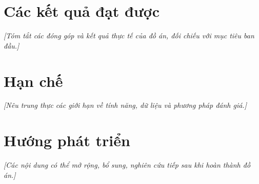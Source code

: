 \section*{Các kết quả đạt được}
\textit{[Tóm tắt các đóng góp và kết quả thực tế của đồ án, đối chiếu với mục tiêu ban đầu.]}

\section*{Hạn chế}
\textit{[Nêu trung thực các giới hạn về tính năng, dữ liệu và phương pháp đánh giá.]}

\section*{Hướng phát triển}
\textit{[Các nội dung có thể mở rộng, bổ sung, nghiên cứu tiếp sau khi hoàn thành đồ án.]}
